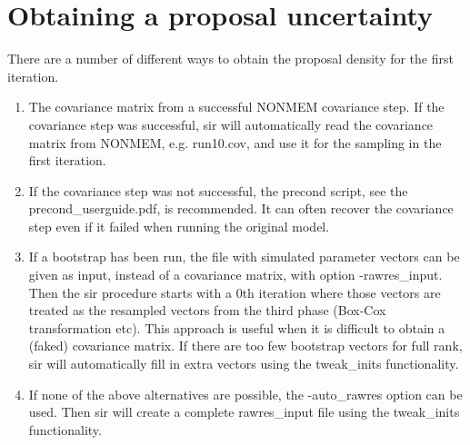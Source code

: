 \section{Obtaining a proposal uncertainty}
There are a number of different ways to obtain the proposal density for the first iteration.
\begin{enumerate}
\item The covariance matrix from a successful NONMEM covariance step. If the covariance step was successful, sir will automatically
read the covariance matrix from NONMEM, e.g. run10.cov,  and use it for the sampling in the first iteration.
\item If the covariance step was not successful, the precond script, see the precond\_userguide.pdf, 
is recommended. It can often recover the covariance step even if it failed when running the original model.
\item If a bootstrap has been run, the file with simulated parameter vectors can be given as input, instead of 
a covariance matrix, with option -rawres\_input. 
Then the sir procedure starts with a 0th iteration where those vectors are treated as the resampled 
vectors from the third phase (Box-Cox transformation etc). This approach is useful when it is difficult to obtain a (faked) covariance matrix. 
If there are too few bootstrap vectors for full rank, sir will automatically fill in extra vectors using the
tweak\_inits functionality.
\item If none of the above alternatives are possible, the -auto\_rawres option can be used.
Then sir will create a complete rawres\_input file using the tweak\_inits functionality.
\end{enumerate}

